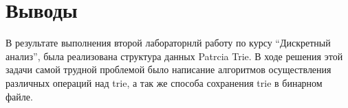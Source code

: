 \section{Выводы}
В результате выполнения второй лабораторнлй работу по курсу \enquote{Дискретный анализ}, была реализована структура данных Patrcia Trie.
В ходе решения этой задачи самой трудной проблемой было написание алгоритмов осуществления различных операций над trie, 
а так же способа сохранения trie в бинарном файле.
\pagebreak
